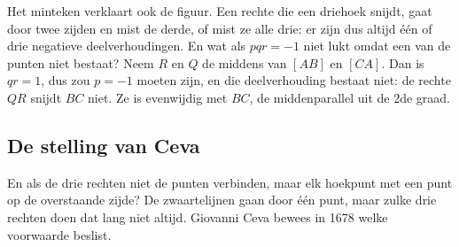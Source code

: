 Het minteken verklaart ook de figuur. Een rechte die een driehoek snijdt, gaat door twee zijden en mist de derde, of mist ze alle drie: er zijn dus altijd één of drie negatieve deelverhoudingen. En wat als $pqr = -1$ niet lukt omdat een van de punten niet bestaat? Neem $R$ en $Q$ de middens van $[AB]$ en $[CA]$. Dan is $qr = 1$, dus zou $p = -1$ moeten zijn, en die deelverhouding bestaat niet: de rechte $QR$ snijdt $BC$ niet. Ze is evenwijdig met $BC$, de middenparallel uit de 2de graad.


\begin{oefeningen}
\end{oefeningen}

\subsection{De stelling van Ceva}

En als de drie rechten niet de punten verbinden, maar elk hoekpunt met een punt op de overstaande zijde? De zwaartelijnen gaan door één punt, maar zulke drie rechten doen dat lang niet altijd. Giovanni Ceva bewees in 1678 welke voorwaarde beslist.

